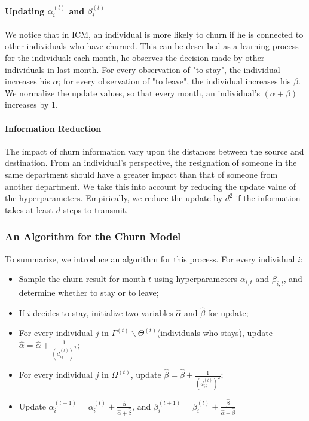\documentclass[tcn = 37075, sheet = false, abstract = false]{mcmthesis}
\begin{document}
	\paragraph{Updating $\alpha_i^{(t)}$ and $\beta_i^{(t)}$} We notice that in ICM, an individual is more likely to churn if he is connected to other individuals who have churned. This can be described as a learning process for the individual: each month, he observes the decision made by other individuals in last month. For every observation of "to stay", the individual increases his $\alpha$; for every observation of "to leave", the individual increases his $\beta$. We normalize the update values, so that every month, an individual's $(\alpha+\beta)$ increases by 1.
	
	\paragraph{Information Reduction} The impact of churn information vary upon the distances between the source and destination. From an individual's perspective, the resignation of someone in the same department should have a greater impact than that of someone from another department. We take this into account by reducing the update value of the hyperparameters. Empirically, we reduce the update by $d^2$ if the information takes at least $d$ steps to transmit. 
	
	\subsubsection{An Algorithm for the Churn Model}
	To summarize, we introduce an algorithm for this process. For every individual $i$:
	\begin{itemize}
		\item Sample the churn result for month $t$ using hyperparameters $\alpha_{i,t}$ and $\beta_{i,t}$, and determine whether to stay or to leave;
		\item If $i$ decides to stay, initialize two variables $\hat{\alpha}$ and $\hat{\beta}$ for update;
		\item For every individual $j$ in $\Gamma^{(t)} \backslash \Theta^{(t)}$(individuals who stays), update $\hat{\alpha} = \hat{\alpha} + \frac{1}{(d_{ij}^{(t)})^2}$;
		\item For every individual $j$ in $\Omega^{(t)}$, update $ \hat{\beta} = \hat{\beta} + \frac{1}{(d_{ij}^{(t)})^2}$;
		\item Update $ \alpha_{i}^{(t+1)}=\alpha_{i}^{(t)}+\frac{\hat{\alpha}}{\hat{\alpha}+\hat{\beta}}$, and $ \beta_{i}^{(t+1)}=\beta_{i}^{(t)}+\frac{\hat{\beta}}{\hat{\alpha}+\hat{\beta}}$
	\end{itemize}
	
\end{document}
